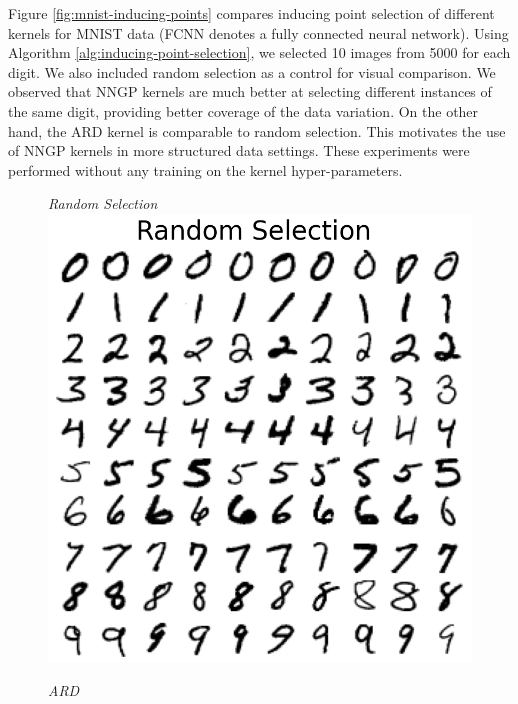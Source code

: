 \documentclass{article}
\numberwithin{equation}{section}
\begin{document}
Figure \ref{fig:mnist-inducing-points} compares inducing point selection of different kernels for MNIST data (FCNN denotes a fully connected neural network). 
Using Algorithm \ref{alg:inducing-point-selection}, we selected 10 images from 5000 for each digit.
We also included random selection as a control for visual comparison.
We observed that NNGP kernels are much better at selecting different instances of the same digit, providing better coverage of the data variation.
On the other hand, the ARD kernel is comparable to random selection. 
This motivates the use of NNGP kernels in more structured data settings.
These experiments were performed without any training on the kernel hyper-parameters.
\begin{figure}[h!]
\small
\centering
\begin{minipage}{.25\textwidth}
  \centering
  \textit{Random Selection}
  \includegraphics[width=\linewidth, trim={0 0 0 1.5cm},clip]{thesis_report/figures/mnist_inducing_point/random_mnist_inducing_point_selection.png}
\end{minipage}%
\begin{minipage}{.25\textwidth}
  \centering
  \textit{ARD}

\end{minipage}
\end{figure}
\end{document}
